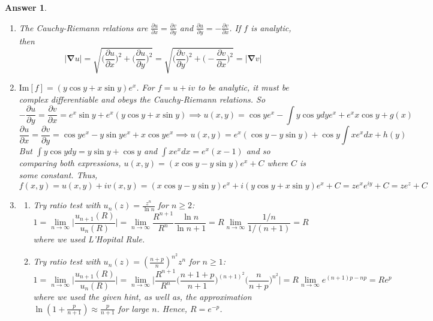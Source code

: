 \documentclass[a4paper]{article}
\newtheorem{ans}{Answer}[section]
\theoremstyle{new}
\begin{document}
\begin{ans}\leavevmode
\begin{enumerate}[label=(\alph*)]
\item The Cauchy-Riemann relations are $\frac{\partial u}{\partial x}=\frac{\partial v}{\partial y}$ and $\frac{\partial u}{\partial y}=-\frac{\partial v}{\partial x}$. If $f$ is analytic, then
$$|\boldsymbol{\nabla}u|=\sqrt{\bigg(\frac{\partial u}{\partial x}\bigg)^2+\bigg(\frac{\partial u}{\partial y}\bigg)^2}=\sqrt{\bigg(\frac{\partial v}{\partial y}\bigg)^2+\bigg(-\frac{\partial v}{\partial x}\bigg)^2}=|\boldsymbol{\nabla}v|$$
\item  $\text{Im}[f]=(y\cos y+x\sin y)e^x$. For $f=u+iv$ to be analytic, it must be complex differentiable and obeys the Cauchy-Riemann relations. So
$$-\frac{\partial u}{\partial y}=\frac{\partial v}{\partial x}=e^x\sin y+e^x(y\cos y+x\sin y)\implies u(x,y)=\cos ye^x-\int y\cos ydy e^x+e^x x\cos y+g(x)$$
$$\frac{\partial u}{\partial x}=\frac{\partial v}{\partial y}=\cos y e^x-y\sin y e^x+x\cos ye^x\implies u(x,y)=e^x(\cos y-y\sin y)+\cos y\int xe^xdx+h(y)$$
But $\int y\cos ydy=y\sin y+\cos y$ and $\int xe^xdx=e^x(x-1)$ and so comparing both expressions, $u(x,y)=(x\cos y-y\sin y)e^x+C$ where $C$ is some constant. Thus,
$$f(x,y)=u(x,y)+iv(x,y)=(x\cos y-y\sin y)e^x+i(y\cos y+x\sin y)e^x+C=ze^xe^{iy}+C=ze^z+C$$
\item 
\begin{enumerate}[label=(\roman*)]
\item Try ratio test with $u_n(z)=\frac{z^n}{\ln n}$ for $n\geq 2$:
$$1=\lim_{n\rightarrow\infty}\bigg|\frac{u_{n+1}(R)}{u_n(R)}\bigg|=\lim_{n\rightarrow\infty}\frac{R^{n+1}}{R^n}\frac{\ln n}{\ln n+1}=R\lim_{n\rightarrow\infty}\frac{1/n}{1/(n+1)}=R$$
where we used L'Hopital Rule.
\item Try ratio test with $u_n(z)=(\frac{n+p}{n})^{n^2}z^n$ for $n\geq 1$:
$$1=\lim_{n\rightarrow\infty}\bigg|\frac{u_{n+1}(R)}{u_n(R)}\bigg|=\lim_{n\rightarrow\infty}\bigg|\frac{R^{n+1}}{R^n}\bigg(\frac{n+1+p}{n+1}\bigg)^{(n+1)^2}\bigg(\frac{n}{n+p}\bigg)^{n^2}\bigg|=R\lim_{n\rightarrow\infty}e^{(n+1)p-np}=Re^p$$
where we used the given hint, as well as, the approximation $\ln(1+\frac{p}{n+1})\approx\frac{p}{n+1}$ for large $n$. Hence, $R=e^{-p}$.
\end{enumerate}
\end{enumerate}
\end{ans}
\newpage
\end{document}
